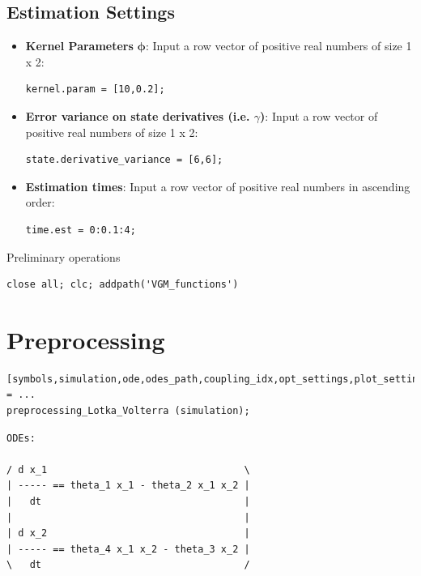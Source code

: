 \subsection{Estimation Settings}
\vspace{1em}
\begin{itemize}
   \item \textbf{Kernel Parameters} $\boldsymbol\phi$: Input a row vector of positive real numbers of size 1 x 2:
    \color{RoyalPurple}\begin{verbatim}
kernel.param = [10,0.2];
\end{verbatim}
\color{black}

   \item \textbf{Error variance on state derivatives (i.e. $\gamma$)}: Input a row vector of positive real numbers of size 1 x 2:
    \color{RoyalPurple}\begin{verbatim}
state.derivative_variance = [6,6];
\end{verbatim}
\color{black}

   \item \textbf{Estimation times}: Input a row vector of positive real numbers in ascending order:
    \color{RoyalPurple}\begin{verbatim}
time.est = 0:0.1:4;
\end{verbatim}
\color{black}
\end{itemize}
\vspace{2em}

\begin{par}
Preliminary operations
\end{par} \vspace{1em}
\color{RoyalPurple}\begin{verbatim}
close all; clc; addpath('VGM_functions')
\end{verbatim}
\color{black}


\section{Preprocessing}

\color{RoyalPurple}\begin{verbatim}
[symbols,simulation,ode,odes_path,coupling_idx,opt_settings,plot_settings] = ...
preprocessing_Lotka_Volterra (simulation);
\end{verbatim}

{\centering
\color{black}

        \color{MidnightBlue}\begin{verbatim} 
ODEs:
 
/ d x_1                                  \
| ----- == theta_1 x_1 - theta_2 x_1 x_2 |
|   dt                                   |
|                                        |
| d x_2                                  |
| ----- == theta_4 x_1 x_2 - theta_3 x_2 |
\   dt                                   /

\end{verbatim}

}
\color{black}


